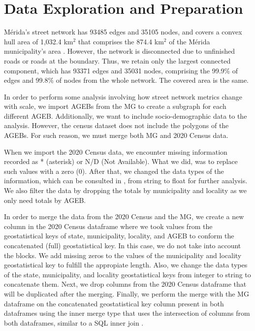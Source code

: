 \section{Data Exploration and Preparation}

Mérida's street network has 93485 edges and 35105 nodes, and covers a convex hull area of 1,032.4 km$^2$ that comprises the 874.4 km$^2$ of the Mérida municipality's area \cite{2020census}. However, the network is disconnected due to unfinished roads or roads at the boundary. Thus, we retain only the largest connected component, which has 93371 edges and 35031 nodes, comprising the 99.9\% of edges and 99.8\% of nodes from the whole network. The covered area is the same. 

In order to perform some analysis involving how street network metrics change with scale, we import AGEBs from the MG to create a subgraph for each different AGEB. Additionally, we want to include socio-demographic data to the analysis. However, the census dataset does not include the polygons of the AGEBs. For such reason, we must merge both MG and 2020 Census data.

When we import the 2020 Census data, we encounter missing information recorded as * (asterisk) or N/D (Not Available). What we did, was to replace such values with a zero (0). After that, we changed the data types of the information, which can be consulted in \cite{census_data}, from string to float for further analysis. We also filter the data by dropping the totals by municipality and locality as we only need totals by AGEB.

In order to merge the data from the 2020 Census and the MG, we create a new column in the 2020 Census dataframe where we took values from the geostatistical keys of state, municipality, locality, and AGEB to conform the concatenated (full) geostatistical key. In this case, we do not take into account the blocks. We add missing zeros to the values of the municipality and locality geostatistical key to fulfill the appropiate length. Also, we change the data types of the state, municipality, and locality geostatistical keys from integer to string to concatenate them. Next, we drop columns from the 2020 Census dataframe that will be duplicated after the merging. Finally, we perform the merge with the MG dataframe on the concatenated geostatistical key column present in both dataframes using the inner merge type that uses the intersection of columns from both dataframes, similar to a SQL inner join \cite{pandas_merge}.

